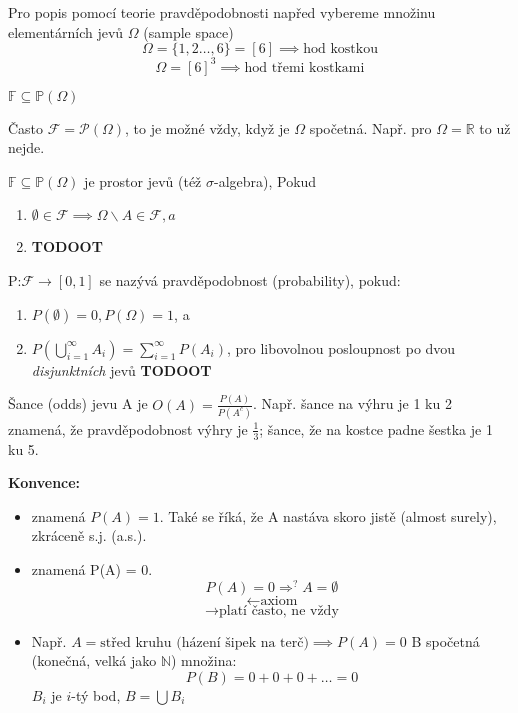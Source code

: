 \documentclass[../main.tex]{subfiles}
\begin{document}
\noindent
Pro popis pomocí teorie pravděpodobnosti napřed vybereme množinu elementárních jevů $\Omega$
(sample space)
\[\Omega = \{1,2\dots,6\} = [6] \implies \text{hod kostkou}\]
\[\Omega = [6]^3 \implies \text{hod třemi kostkami}\]

\begin{definition}
    $\mathbb{F} \subseteq \mathbb{P}(\Omega)$

    Často $\mathcal{F} = \mathcal{P}(\Omega)$, to je možné vždy, když je $\Omega$ spočetná.
    Např. pro $\Omega = \mathbb{R}$ to už nejde.


    $\mathbb{F} \subseteq \mathbb{P}(\Omega)$ je prostor jevů (též $\sigma$-algebra), Pokud
    \begin{enumerate}
        \item $\emptyset \in \mathcal{F} \implies \Omega \backslash A \in \mathcal{F}, a$
        \item \textbf{TODOOT}
    \end{enumerate}
\end{definition}

\begin{definition}[Pravděpodobnost]
    P:$\mathcal{F} \rightarrow [0,1]$ se nazývá pravděpodobnost (probability), pokud:
    \begin{enumerate}
        \item $P(\emptyset) = 0, P(\Omega) = 1$, a
        \item $P(\bigcup^\infty_{i=1}A_i) = \sum^\infty_{i=1}P(A_i)$, pro libovolnou posloupnost po dvou \textit{disjunktních} jevů \textbf{TODOOT}
    \end{enumerate}
    Šance (odds) jevu A je $O(A) = \frac{P(A)}{P(A^c)}$. Např. šance na výhru je 1 ku 2 znamená, že
    pravděpodobnost výhry je $\frac{1}{3}$; šance, že na kostce padne šestka je 1 ku 5.
\end{definition}

\noindent
\textbf{Konvence:}
\begin{itemize}
    \item
     znamená $P(A) = 1.$ Také se říká, že A nastáva skoro jistě (almost surely), zkráceně s.j. (a.s.).

    \item
     znamená P(A) = 0.
    \[P(A) = 0 \Rightarrow^? A = \emptyset\]
    \[\leftarrow \text{axiom}\]
    \[\rightarrow \text{platí často, ne vždy}\]

    \item
    Např. $A = {\text{střed kruhu (házení šipek na terč})} \implies P(A) = 0$
    B spočetná (konečná, velká jako $\mathbb{N}$) množina:
    \[P(B) = 0+0+0+\dots=0\]
    $B_i$ je $i$-tý bod,
    $B = \bigcup B_i$
\end{itemize}
\end{document}
